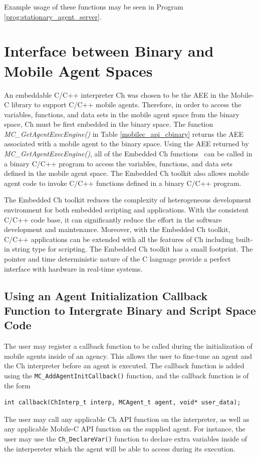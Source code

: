 \documentclass[11pt]{report}
\begin{document}
Example usage of these functions may be seen in Program \ref{prog:stationary_agent_server}.

\chapter{Interface between Binary and Mobile Agent Spaces
\label{chap:interface_binary_to_agent}}
An embeddable C/C++ interpreter Ch was chosen to be the AEE in the Mobile-C 
library to support C/C++ mobile agents. 
Therefore, in order to access the variables, functions, and data sets in 
the mobile agent space from the binary space, Ch must be first embedded in the 
binary space.
The function \textit{MC\_GetAgentExecEngine()}  in 
Table \ref{mobilec_api_cbinary} returns the AEE associated with a mobile agent 
to the binary space.
Using the AEE returned by \textit{MC\_GetAgentExecEngine()}, all of the 
Embedded Ch functions~\cite{EmbeddedCh} can be called in a binary C/C++ 
program to access the variables, functions, and data sets defined in the 
mobile agent space.
The Embedded Ch toolkit also allows mobile agent code to invoke C/C++ 
functions defined in a binary C/C++ program.

The Embedded Ch toolkit reduces the complexity of heterogeneous development 
environment for both embedded scripting and applications. 
With the consistent C/C++ code base, it can significantly reduce the effort 
in the software development and maintenance. 
Moreover, with the Embedded Ch toolkit, C/C++ applications can be extended 
with all the features of Ch including built-in string type for scripting. 
The Embedded Ch toolkit has a small footprint. 
The pointer and time deterministic nature of the C language provide a 
perfect interface with hardware in real-time systems.

\section{Using an Agent Initialization Callback Function to Intergrate Binary
and Script Space Code}
The user may register a callback function to be called during the initialization
of mobile agents inside of an agency. This allows the user to fine-tune 
an agent and the Ch interpreter before an agent is executed. The callback
function is added using the \texttt{MC\_AddAgentInitCallback()} function,
and the callback function is of the form
\begin{verbatim}
int callback(ChInterp_t interp, MCAgent_t agent, void* user_data);
\end{verbatim}
The user may call any applicable Ch API function on the interpreter,
as well as any applicable Mobile-C API function on the supplied agent.
For instance, the user may use the \texttt{Ch\_DeclareVar()} function
to declare extra variables inside of the interpereter which the agent
will be able to access during its execution. 
\end{document}
